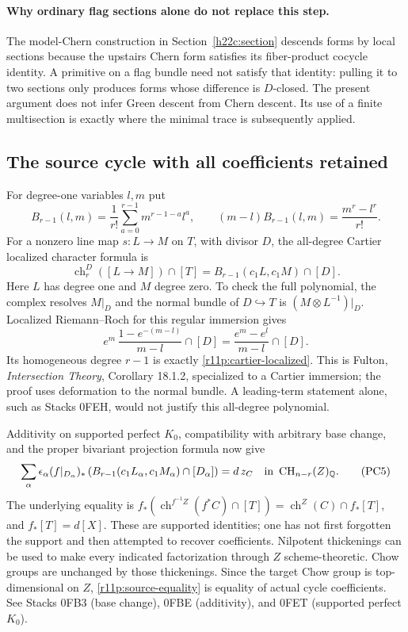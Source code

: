 \documentclass[11pt,a4paper]{article}
\theoremstyle{definition}
\theoremstyle{remark}
\begin{document}
\paragraph*{Why ordinary flag sections alone do not replace this step.}
The model-Chern construction in Section~\ref{h22c:section} descends forms by local sections because the
upstairs Chern form satisfies its fiber-product cocycle identity.
A primitive on a flag bundle need not satisfy that identity: pulling
it to two sections only produces forms whose difference is $D$-closed.
The present argument does not infer Green descent from Chern descent.
Its use of a finite multisection is exactly where the minimal trace is
subsequently applied.

\subsection{The source cycle with all coefficients retained}

For degree-one variables $l,m$ put
\[
 B_{r-1}(l,m)=\frac1{r!}\sum_{a=0}^{r-1}m^{r-1-a}l^a,
 \qquad
                  (m-l)B_{r-1}(l,m)=\frac{m^r-l^r}{r!}.
\tag{PC3}\label{r11p:B-polynomial}
\]
For a nonzero line map $s:L\to M$ on $T$, with divisor $D$, the
all-degree Cartier localized character formula is
\[
 \operatorname{ch}^{D}_r([L\to M])\cap[T]
         =B_{r-1}(c_1L,c_1M)\cap[D].
\tag{PC4}\label{r11p:cartier-localized}
\]
Here $L$ has degree one and $M$ degree zero.  To check the full
polynomial, the complex resolves $M|_D$ and the normal bundle of
$D\hookrightarrow T$ is $(M\otimes L^{-1})|_D$.  Localized
Riemann--Roch for this regular immersion gives
\[
 e^m\,\frac{1-e^{-(m-l)}}{m-l}\cap[D]
                         =\frac{e^m-e^l}{m-l}\cap[D].
\]
Its homogeneous degree $r-1$ is exactly \eqref{r11p:cartier-localized}.
This is Fulton, \emph{Intersection Theory}, Corollary 18.1.2,
specialized to a Cartier immersion; the proof uses deformation to the
normal bundle.  A leading-term statement alone, such as Stacks 0FEH,
would not justify this all-degree polynomial.

Additivity on supported perfect $K_0$, compatibility with arbitrary
base change, and the proper bivariant projection formula now give
\[
 \sum_\alpha\epsilon_\alpha
    (f|_{D_\alpha})_*
       \left(B_{r-1}(c_1L_\alpha,c_1M_\alpha)\cap[D_\alpha]\right)
                              =d\,z_C
       \quad\hbox{in }\operatorname{CH}_{n-r}(Z)_{\mathbb Q}.
\tag{PC5}\label{r11p:source-equality}
\]
The underlying equality is
$f_*(\operatorname{ch}^{f^{-1}Z}(f^*C)\cap[T])
=\operatorname{ch}^Z(C)\cap f_*[T]$, and $f_*[T]=d[X]$.
These are supported identities; one has not first forgotten the
support and then attempted to recover coefficients.  Nilpotent
thickenings can be used to make every indicated factorization through
$Z$ scheme-theoretic.  Chow groups are unchanged by those thickenings.
Since the target Chow group is top-dimensional on $Z$,
\eqref{r11p:source-equality} is equality of actual cycle coefficients.
See Stacks 0FB3 (base change), 0FBE (additivity), and 0FET (supported
perfect $K_0$).
\end{document}

